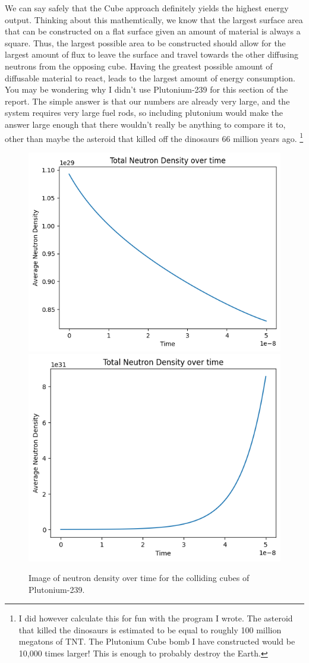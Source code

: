 \documentclass[letterpaper, 12pt]{article}
\begin{document}
         We can say safely that the Cube approach definitely yields the highest energy output. Thinking about this mathemtically, we know that the largest surface area that can be constructed on a flat surface given an amount of material is always a square. Thus, the largest possible area to be constructed should allow for the largest amount of flux to leave the surface and travel towards the other diffusing neutrons from the opposing cube. Having the greatest possible amount of diffusable material to react, leads to the largest amount of energy consumption.\\

         You may be wondering why I didn't use Plutonium-239 for this section of the report. The simple answer is that our numbers are already very large, and the system requires very large fuel rods, so including plutonium would make the answer large enough that there wouldn't really be anything to compare it to, other than maybe the asteroid that killed off the dinosaurs 66 million years ago. \footnote{I did however calculate this for fun with the program I wrote. The asteroid that killed the dinosaurs is estimated to be equal to roughly 100 million megatons of TNT. The Plutonium Cube bomb I have constructed would be 10,000 times larger! This is enough to probably destroy the Earth.}


         \begin{figure}
            \centering
            \includegraphics[width=0.4\linewidth]{Graphs/URANIUM-DECAY-GRAPH.png}
            \includegraphics[width=0.4\linewidth]{Graphs/URANIUM-GROWTH-GRAPH.png}
            \caption{Image of neutron density over time for the colliding cubes of Plutonium-239.}
            \label{URANIUM-GRAPH-DENSITY}
         \end{figure}
\end{document}
